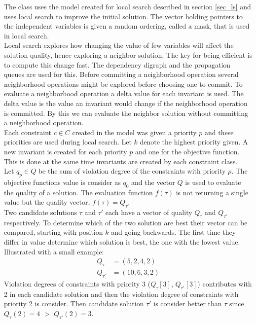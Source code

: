 The  class uses the model created for local search described in section \ref{sec_ls} and 
uses local search to improve the initial solution. The vector holding pointers to the independent variables is given a 
random ordering, called a mask, that is used in local search. \\
Local search explores how changing the value of few variables will affect the solution quality, hence exploring a 
neighbor 
solution. The key for being efficient is to compute this change fast. The dependency digraph and the propagation 
queues are used for this. Before committing a neighborhood operation several neighborhood operations might be explored 
before choosing one to commit. To evaluate a neighborhood operation a delta value for each invariant is used. The 
delta value is the value an invariant would change if the neighborhood operation is committed. By this we can evaluate 
the neighbor solution without committing a neighborhood operation. \\
Each constraint $c \in C$ created in the model was given a priority $p$ and these priorities are used during local 
search. Let $k$ denote the highest priority given. A new  invariant is created for each priority $p$ and 
one for the objective function. This is done at the same time invariants are created by each constraint class. \\
Let $q_p \in Q$ be the sum of violation degree of the constraints with priority $p$. The objective functions 
value is consider as $q_0$ and the vector $Q$ is used to evaluate the quality of a solution. The evaluation function 
$f(\tau)$ is not returning a single value but the quality vector, $f(\tau) = Q_\tau$.  \\ 
Two candidate solutions $\tau$ and $\tau'$ each have a vector of quality $Q_\tau$ and $Q_{\tau'}$ respectively. To 
determine which of the two solution are best their vector can be compared, starting with position $k$ and going 
backwards. The first time they differ in value determine which solution is best, the one with the lowest value. 
Illustrated with a small example:
\begin{align}
 Q_\tau &= (5,2,4,2) \\ 
 Q_{\tau'} &=(10,6,3,2) 
\end{align}
Violation degrees of constraints with priority 3 ($Q_\tau[3]$, $Q_{\tau'}[3]$) contributes with 2 in each candidate 
solution and then the violation degree of constraints with priority 2 is consider. Then candidate solution $\tau'$ is 
consider better than $\tau$ since $Q_\tau(2) = 4$ $>$ $Q_{\tau'}(2) = 3$. \\

